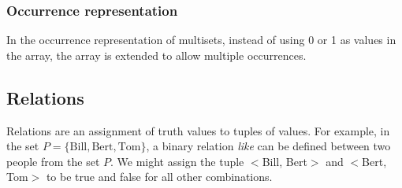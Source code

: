 \documentclass[CS4402-Notes.tex]{subfiles}
\begin{document}
\subsubsection{Occurrence representation}
In the occurrence representation of multisets, instead of using 0 or 1 as values in the array, the array is extended to allow multiple occurrences.

\subsection{Relations}
Relations are an assignment of truth values to tuples of values. For example, in the set $P = \{\text{Bill}, \text{Bert}, \text{Tom}\}$, a binary relation \textit{like} can be defined between two people from the set $P$. We might assign the tuple $<$Bill, Bert$>$ and $<$Bert, Tom$>$ to be true and false for all other combinations.
\end{document}
